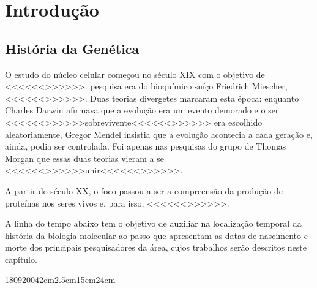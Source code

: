\chapter{Introdução}

\section{História da Genética}

\indent O estudo do núcleo celular começou no século XIX com o objetivo de <<<<<<>>>>>>.  pesquisa era do bioquímico suíço Friedrich Miescher, <<<<<<>>>>>>. Duas teorias divergetes marcaram esta época: enquanto Charles Darwin afirmava que a evolução era um evento demorado e o ser <<<<<<>>>>>>sobrevivente<<<<<<>>>>>> era escolhido aleatoriamente, Gregor Mendel insistia que a evolução acontecia a cada geração e, ainda, podia ser controlada. Foi apenas nas pesquisas do grupo de Thomas Morgan que essas duas teorias vieram a se <<<<<<>>>>>>unir<<<<<<>>>>>>.

A partir do século XX, o foco passou a ser a compreensão da produção de proteínas nos seres vivos e, para isso, <<<<<<>>>>>>.

\indent A linha do tempo abaixo tem o objetivo de auxiliar na localização temporal da história da biologia molecular ao passo que apresentam as datas de nascimento e morte dos principais pesquisadores da área, cujos trabalhos serão descritos neste capítulo. 


\begin{timeline}{1809}{2004}{2cm}{2.5cm}{15cm}{24cm}
\end{timeline}

